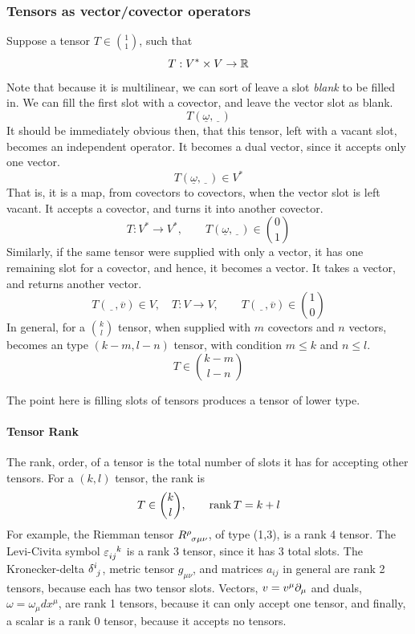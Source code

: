 	\subsubsection{Tensors as vector/covector operators}
		Suppose a tensor $T\in\binom{1}{1}$, such that
		\[
			T: V^*\times V\to \mathbb{R}
		\]
		Note that because it is multilinear, we can sort of 
		leave a slot \textit{blank} to be filled in. We can
		fill the first slot with a covector, and leave the vector 
		slot as blank.
		\[
			T(\underline\omega,\underline{\phantom{x}})
		\]
		It should be immediately obvious then, that this tensor, left with a vacant slot, becomes
		an independent operator. It becomes a dual vector, since it accepts only one vector.
		\[
			T(\underline\omega,\underline{\phantom{x}})
			\in V^*
		\]
		That is, it is a map, from covectors to covectors, when the vector slot is left vacant.
		It accepts a covector, and turns it into another covector.
		\[
			T:V^* \to V^*,\qquad 
			T(\underline\omega,\underline{\phantom{x}})
			\in\binom{0}{1}
		\]
		Similarly, if the same tensor were supplied with only a vector, it has one remaining slot
		for a covector, and hence, it becomes a vector. It takes a vector, and returns another vector.
		\[
			T(
				\underline{\phantom{\omega}},
				\overline{v}
			)
			\in V,\quad T:V \to V ,\qquad 
			T(
				\underline{\phantom{\omega}},
				\overline{v}
			)
			\in\binom{1}{0}
		\]
		In general, for a $\binom{k}{l}$ tensor, when supplied with $m$ covectors and $n$ vectors,
		becomes an type $(k-m, l-n)$ tensor, with condition $m\leq k$ and $n\leq l$. 
		\[
			T\in\binom{k-m}{l-n}
		\]

		The point here is filling slots of tensors 
		produces a tensor of lower type.

		\paragraph{Tensor Rank} The rank, order, of a tensor is the total number of slots it has
		for accepting other tensors. For a $(k,l)$ tensor, the rank is
		\[
			T\in\binom{k}{l},\qquad \rank T = k+l
		\]
		For example, the Riemman tensor $\tensor{R}{^\rho_{\sigma\mu\nu}}$, of type (1,3), is a rank 4 tensor. The Levi-Civita symbol $\tensor{\varepsilon}{_{ij}^k}$ is a rank 3 tensor, since it has 3 total slots.
		The Kronecker-delta $\tensor{\delta}{^i_j}$, metric tensor $g_{\mu\nu}$, and matrices $a_{ij}$ in general are rank 2 tensors, because
		each has two tensor slots. Vectors, $v = v^\mu \partial_\mu$ and duals, $\omega = \omega_\mu dx^\mu$, are rank 1 tensors, because
		it can only accept one tensor, and finally, a scalar is a
		rank 0 tensor, because it accepts no tensors. 

